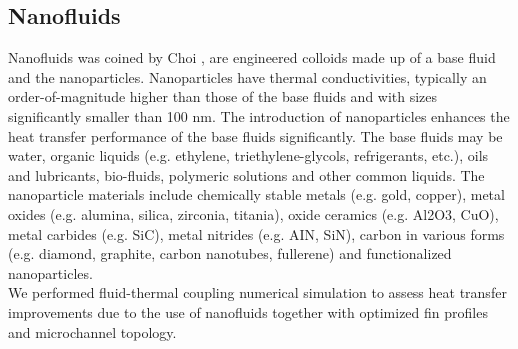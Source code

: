 \documentclass[../main.tex]{subfiles}
\begin{document}
\subsection{Nanofluids}
Nanofluids was coined by Choi , are engineered
colloids made up of a base fluid and the nanoparticles.
Nanoparticles have thermal conductivities, typically an order-of-magnitude
higher than those of the base fluids and with sizes significantly
smaller than 100 nm. The introduction of nanoparticles enhances
the heat transfer performance of the base fluids significantly. The
base fluids may be water, organic liquids (e.g. ethylene, triethylene-glycols, refrigerants, etc.), oils and lubricants, bio-fluids,
polymeric solutions and other common liquids. The nanoparticle
materials include chemically stable metals (e.g. gold, copper),
metal oxides (e.g. alumina, silica, zirconia, titania), oxide ceramics
(e.g. Al2O3, CuO), metal carbides (e.g. SiC), metal nitrides (e.g. AIN,
SiN), carbon in various forms (e.g. diamond, graphite, carbon
nanotubes, fullerene) and functionalized nanoparticles.
\\
We performed fluid-thermal coupling numerical simulation to assess heat transfer improvements due to the use of nanofluids together with optimized fin profiles and microchannel topology.
\end{document}
